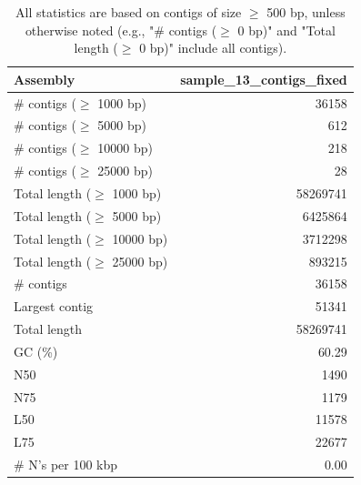 \documentclass[12pt,a4paper]{article}
\begin{document}
\begin{table}[ht]
\begin{center}
\caption{All statistics are based on contigs of size $\geq$ 500 bp, unless otherwise noted (e.g., "\# contigs ($\geq$ 0 bp)" and "Total length ($\geq$ 0 bp)" include all contigs).}
\begin{tabular}{|l*{1}{|r}|}
\hline
Assembly & sample\_13\_contigs\_fixed \\ \hline
\# contigs ($\geq$ 1000 bp) & 36158 \\ \hline
\# contigs ($\geq$ 5000 bp) & 612 \\ \hline
\# contigs ($\geq$ 10000 bp) & 218 \\ \hline
\# contigs ($\geq$ 25000 bp) & 28 \\ \hline
Total length ($\geq$ 1000 bp) & 58269741 \\ \hline
Total length ($\geq$ 5000 bp) & 6425864 \\ \hline
Total length ($\geq$ 10000 bp) & 3712298 \\ \hline
Total length ($\geq$ 25000 bp) & 893215 \\ \hline
\# contigs & 36158 \\ \hline
Largest contig & 51341 \\ \hline
Total length & 58269741 \\ \hline
GC (\%) & 60.29 \\ \hline
N50 & 1490 \\ \hline
N75 & 1179 \\ \hline
L50 & 11578 \\ \hline
L75 & 22677 \\ \hline
\# N's per 100 kbp & 0.00 \\ \hline
\end{tabular}
\end{center}
\end{table}
\end{document}
